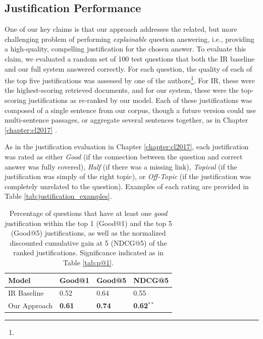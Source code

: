 \subsection{Justification Performance}
\label{sec-emnlp2017:justification_results}
One of our key claims is that our approach addresses the related, but more challenging problem of performing \emph{explainable} question answering, i.e., providing a high-quality, compelling justification for the chosen answer.  To evaluate this claim, we evaluated a random set of 100 test questions that both the IR baseline and our full system answered correctly.  For each question, the quality of each of the top five justifications was assessed by one of the authors\footnote{}.  For IR, these were the highest-scoring retrieved documents, and for our system, these were the top-scoring justifications as re-ranked by our model.  
Each of these justifications was composed of a single sentence from our corpus, though a future version could use multi-sentence passages, or aggregate several sentences together, as in Chapter \ref{chapter:cl2017} \citep{jansen2017framing}.

As in the justification evaluation in Chapter \ref{chapter:cl2017}, each justification was rated as either \emph{Good} (if the connection between the question and correct answer was fully covered), \emph{Half} (if there was a missing link), \emph{Topical} (if the justification was simply of the right topic), or \emph{Off-Topic} (if the justification was completely unrelated to the question). Examples of each rating are provided in Table \ref{tab:justification_examples}.  

\begin{table}[t]
\begin{center}
\begin{tabular}{llll}
\hline
 Model 			& Good@1 	& Good@5 	& NDCG@5 \\ 
\hline
IR Baseline 	&	0.52 		&	0.64 		& 0.55 \\
Our Approach & 	{\bf 0.61}	 	&	{\bf 0.74}			& {\bf 0.62}$^{**}$ \\
\end{tabular}
\caption{{Percentage of questions that have at least one \emph{good} justification within the top 1 (Good@1) and the top 5 (Good@5) justifications, 
as well as the normalized discounted cumulative gain at 5 (NDCG@5) of the ranked justifications.
 Significance indicated as in Table \ref{tab:p@1}.
}} 
\label{tab:justification_ndcg}
\end{center}
\end{table}


